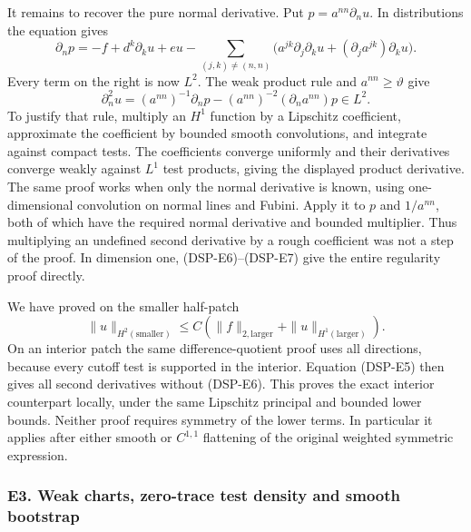 \documentclass[
  11pt,
]{article}
\makeatletter
\let\ReaderOriginalAnchorStart\hyper@anchorstart
\let\ReaderOriginalAnchorEnd\hyper@anchorend
\let\ReaderPendingAliases\@empty
\def\ReaderArmAliases#1{\gdef\ReaderPendingAliases{#1}}
\def\hyper@anchorstart#1{\ReaderIfNativeAnchorTF{#1}{\ReaderPendingAliases\global\let\ReaderPendingAliases\@empty}{}\ReaderOriginalAnchorStart{#1}}
\makeatother
\begin{document}
It remains to recover the pure normal derivative. Put
\(p=a^{nn}\partial_nu\). In distributions the equation gives \[
 \partial_np=-f+d^k\partial_ku+eu
 -\sum_{(j,k)\ne(n,n)}
       \bigl(a^{jk}\partial_j\partial_ku
                   +(\partial_ja^{jk})\partial_ku\bigr).
 \tag{DSP-E6}
\] Every term on the right is now \(L^2\). The weak product rule and
\(a^{nn}\geq\vartheta\) give \[
 \partial_n^2u=(a^{nn})^{-1}\partial_np
 -(a^{nn})^{-2}(\partial_na^{nn})p\in L^2.
 \tag{DSP-E7}
\] To justify that rule, multiply an \(H^1\) function by a Lipschitz
coefficient, approximate the coefficient by bounded smooth convolutions,
and integrate against compact tests. The coefficients converge uniformly
and their derivatives converge weakly against \(L^1\) test products,
giving the displayed product derivative. The same proof works when only
the normal derivative is known, using one-dimensional convolution on
normal lines and Fubini. Apply it to \(p\) and \(1/a^{nn}\), both of
which have the required normal derivative and bounded multiplier. Thus
multiplying an undefined second derivative by a rough coefficient was
not a step of the proof. In dimension one, (DSP-E6)--(DSP-E7) give the
entire regularity proof directly.

We have proved on the smaller half-patch \[
 \|u\|_{H^2(\mathrm{smaller})}
 \leq C(\|f\|_{2,\mathrm{larger}}+
                \|u\|_{H^1(\mathrm{larger})}).\tag{DSP-E8}
\] On an interior patch the same difference-quotient proof uses all
directions, because every cutoff test is supported in the interior.
Equation (DSP-E5) then gives all second derivatives without (DSP-E6).
This proves the exact interior counterpart locally, under the same
Lipschitz principal and bounded lower bounds. Neither proof requires
symmetry of the lower terms. In particular it applies after either
smooth or \(C^{1,1}\) flattening of the original weighted symmetric
expression.

\ReaderArmAliases{\ReaderOriginalAnchorStart{e3.-weak-charts-zero-trace-test-density-and-smooth-bootstrap}\ReaderOriginalAnchorEnd}
\subsubsection{E3. Weak charts, zero-trace test density and smooth
bootstrap}\label{e3.-weak-charts-zero-trace-test-density-and-smooth-bootstrap}
\end{document}
